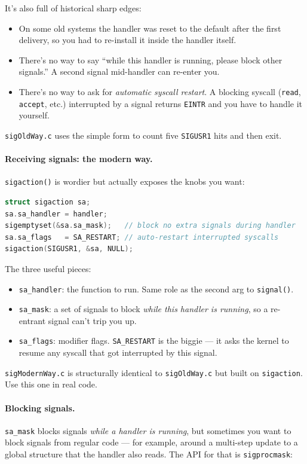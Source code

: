\documentclass[11pt]{article}
\begin{document}
It's also full of historical sharp edges:
\begin{itemize}
  \item On some old systems the handler was reset to the default
    after the first delivery, so you had to re-install it inside the
    handler itself.
  \item There's no way to say ``while this handler is running, please
    block other signals.'' A second signal mid-handler can re-enter
    you.
  \item There's no way to ask for \emph{automatic syscall restart}.
    A blocking syscall (\texttt{read}, \texttt{accept}, etc.)
    interrupted by a signal returns \texttt{EINTR} and you have to
    handle it yourself.
\end{itemize}

\texttt{sigOldWay.c} uses the simple form to count five
\texttt{SIGUSR1} hits and then exit.

\paragraph{Receiving signals: the modern way.}
\texttt{sigaction()} is wordier but actually exposes the knobs you
want:

\begin{lstlisting}[language=C]
struct sigaction sa;
sa.sa_handler = handler;
sigemptyset(&sa.sa_mask);   // block no extra signals during handler
sa.sa_flags   = SA_RESTART; // auto-restart interrupted syscalls
sigaction(SIGUSR1, &sa, NULL);
\end{lstlisting}

The three useful pieces:
\begin{itemize}
  \item \texttt{sa\_handler}: the function to run. Same role as the
    second arg to \texttt{signal()}.
  \item \texttt{sa\_mask}: a set of signals to block \emph{while this
    handler is running}, so a re-entrant signal can't trip you up.
  \item \texttt{sa\_flags}: modifier flags. \texttt{SA\_RESTART} is the
    biggie --- it asks the kernel to resume any syscall that got
    interrupted by this signal.
\end{itemize}

\texttt{sigModernWay.c} is structurally identical to
\texttt{sigOldWay.c} but built on \texttt{sigaction}. Use this one in
real code.

\paragraph{Blocking signals.} \texttt{sa\_mask} blocks signals
\emph{while a handler is running}, but sometimes you want to block
signals from regular code --- for example, around a multi-step update
to a global structure that the handler also reads. The API for that
is \texttt{sigprocmask}:
\end{document}
